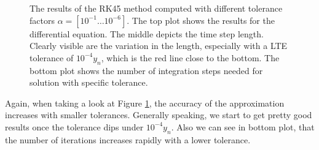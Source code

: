 \documentclass{aa}
\begin{document}
\begin{figure}[htbp]
    \caption{The results of the RK45 method computed with different tolerance factors \(\alpha
    = [10^{-1} \dots 10^{-6}]\). The top plot shows the results for the differential equation.
    The middle depicts the time step length. Clearly visible are the variation in the length,
    especially with a LTE tolerance of \(10^{-4}y_n\), which is the red line close to the
    bottom. The bottom plot shows the number of integration steps needed for solution with
    specific tolerance.}
    \label{fig:res_rkf}
\end{figure}
Again, when taking a look at Figure \ref{fig:res_rkf}, the accuracy of
the approximation increases with smaller tolerances. Generally speaking, we start to get pretty
good results once the tolerance dips under \(10^{-4}y_n\). Also we can see in bottom plot, that
the number of iterations increases rapidly with a lower tolerance.
\end{document}
